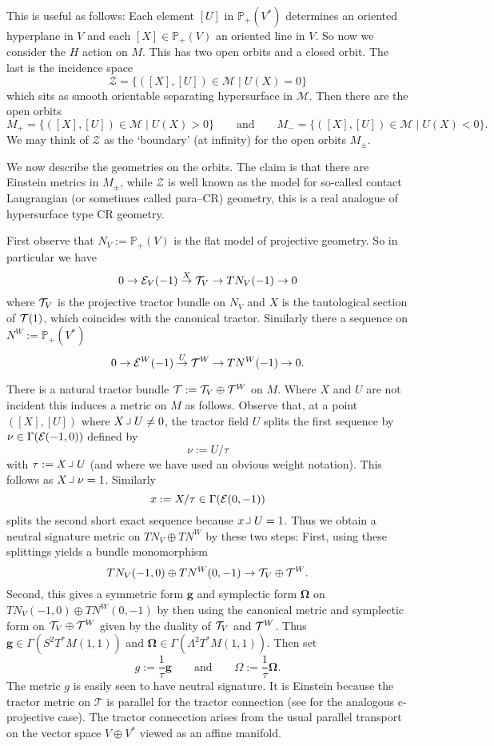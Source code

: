 This is useful as follows: Each element $[U]$ in
$\mathbb{P}_+(V^*)$ determines an oriented  hyperplane in $V$ and each $[X]\in
\mathbb{P}_+(V)$ an oriented line in $V$.  So now we consider the $H$
action on $M$. This has two open orbits and a closed orbit. The last
is the incidence space 
$$
\mathcal{Z}=\{ ([X],[U])\in \mathcal{M} \mid U(X)=0 \} 
$$
which sits as smooth orientable separating hypersurface in $\mathcal{M}$. Then there are the open orbits
$$
M_+=\{ ([X],[U])\in \mathcal{M} \mid U(X)>0 \} \qquad \mbox{and} \qquad
M_-=\{ ([X],[U])\in \mathcal{M} \mid U(X)<0 \}.
$$
We may think of $\mathcal{Z}$ as the `boundary' (at infinity) for the open orbits $M_\pm$.

We now describe the geometries on the orbits. The claim is that there
are Einstein metrics in $M_\pm$, while $\mathcal{Z}$ is well known as
the model for so-called contact Langrangian (or sometimes called
para--CR) geometry, this is a real analogue of hypersurface type CR
geometry.

First observe that $N_V:=\mathbb{P}_+(V)$
is the flat model of projective
geometry. So in particular we have
$$
0\to \mathcal{E}_V(-1)\stackrel{X}{\to}\mathcal{T}_V\to TN_V(-1)\to 0
$$
where $\mathcal{T}_V$ is the projective tractor bundle on $N_V$ and $X$ is the
tautological section of $\mathcal{T}(1)$, which coincides with the canonical tractor.
Similarly there a sequence on
$N^W:= \mathbb{P}_+(V^*)$
\begin{equation}\label{useful}
0\to \mathcal{E}^W(-1)\stackrel{U}{\to}\mathcal{T}^W \to TN^W(-1)\to 0 .
\end{equation}

There is a natural tractor bundle $\mathcal{T}:=\mathcal{T}_V\oplus \mathcal{T}^W $ on $M$. 
Where $X$ and $U$ are not incident this induces a metric on $M$ as
follows. Observe that, at a point $([X],[U])$ where $X\hook U \neq 0$, the  tractor field  $U$ splits the first sequence by $\nu\in \Gamma (\mathcal{E}(-1,0))$ defined by
$$
\nu:=U/\tau
$$
with $\tau:=X\hook U$ (and where we have used an obvious weight
notation). This follows as $X\hook \nu=1$. Similarly
$$
x:=X/\tau \in \Gamma (\mathcal{E}(0,-1))
$$
splits the second short exact sequence because $x \hook U=1$. Thus we
obtain a neutral signature metric on $TN_V\oplus TN^W$ by these
two steps: First, using  these splittings yields a bundle
monomorphism
$$
TN_V(-1,0)\oplus TN^W(0,-1) \to \mathcal{T}_V\oplus \mathcal{T}^W .
$$ Second, this gives a symmetric form $\boldsymbol{g}$ and symplectic form
$\boldsymbol{\Omega}$ on $TN_V(-1,0)\oplus TN^W(0,-1)$ by then using
the canonical metric and symplectic form on $\mathcal{T}_V\oplus \mathcal{T}^W $ given
by the duality of $\mathcal{T}_V$ and $ \mathcal{T}^W$. Thus $\boldsymbol{g}\in \Gamma
(S^2T^*M(1,1))$ and $\boldsymbol{\Omega}\in \Gamma
(\Lambda^2T^*M(1,1))$. Then set
$$ g:=\frac{1}{\tau}\boldsymbol{g} \qquad \mbox{and} \qquad  \Omega:=\frac{1}{\tau}\boldsymbol{\Omega}.
$$
The metric $g$ is easily seen to have neutral signature.  It is
Einstein because the tractor metric on $\mathcal{T}$ is parallel for the
tractor connection (see \cite{CGH-duke} for the analogous c-projective
case). The tractor connecction arises from the usual parallel transport on the
vector space $V\oplus V^*$ viewed as an affine manifold.

